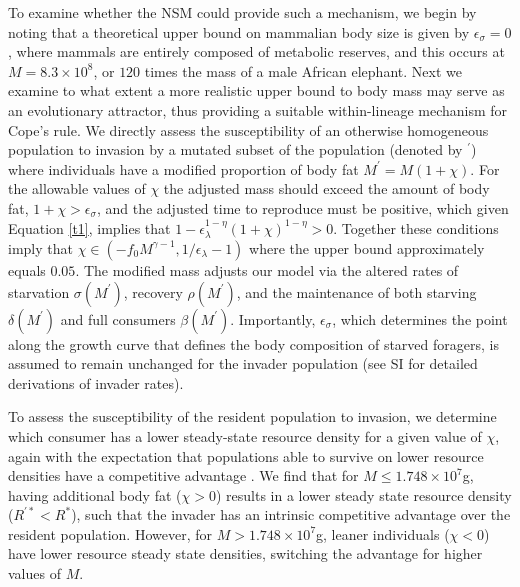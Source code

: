 \documentclass{pnastwo}
\newcommand{\sid}[1]{\textcolor{red}{\bf [#1]}}
\begin{document}
\begin{article}
To examine whether the NSM could provide such a mechanism, we begin by noting that a theoretical upper bound on mammalian body size is given by $\epsilon_\sigma=0$, where mammals are entirely composed of metabolic reserves, and this occurs at $M=8.3\times 10^8$, or $120$ times the mass of a male African elephant.
Next we examine to what extent a more realistic upper bound to body mass may serve as an evolutionary attractor, thus providing a suitable within-lineage mechanism for Cope's rule.
We directly assess the susceptibility of an otherwise homogeneous population to invasion by a mutated subset of the population (denoted by $^\prime$) where individuals have a modified proportion of body fat $M^\prime=M(1+\chi)$.
For the allowable values of $\chi$ the adjusted mass should exceed the amount of body fat, $1+\chi>\epsilon_{\sigma}$, and the adjusted time to reproduce must be positive, which given Equation \ref{t1}, implies that $1-\epsilon_{\lambda}^{1-\eta}\left(1+\chi\right)^{1-\eta}>0$.
Together these conditions imply that  $\chi\in(-f_0M^{\gamma-1},1/\epsilon_{\lambda}-1)$ where the upper bound approximately equals $0.05$.
The modified mass adjusts our model via the altered rates of starvation $\sigma(M^\prime)$, recovery $\rho(M^\prime)$, and the maintenance of both starving $\delta(M^\prime)$ and full consumers $\beta(M^\prime)$.
Importantly, $\epsilon_\sigma$, which determines the point along the growth curve that defines the body composition of starved foragers, is assumed to remain unchanged for the invader population (see SI for detailed derivations of invader rates).

To assess the susceptibility of the resident population to invasion, we determine which consumer has a lower steady-state resource density for a given value of $\chi$, again with the expectation that populations able to survive on lower resource densities have a competitive advantage \cite{tilman1981}.
We find that for $M\leq 1.748\times10^7$g, having additional body fat ($\chi > 0$) results in a lower steady state resource density ($R^{\prime *}<R^*$), such that the invader has an intrinsic competitive advantage over the resident population.
However, for $M> 1.748\times10^7$g, leaner individuals ($\chi < 0$) have lower resource steady state densities, switching the advantage for higher values of $M$.




\end{article}
\end{document}
